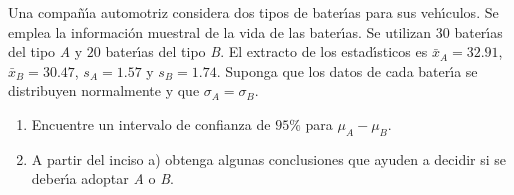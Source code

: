 \begin{enunciado}
 Una compa\~n\'{\i}a automotriz considera dos tipos de bater\'{\i}as para sus veh\'{\i}culos. Se emplea la informaci\'on muestral de la vida de las bater\'{\i}as. Se utilizan $30$ bater\'{\i}as del tipo \textit{A} y $20$ bater\'{\i}as del tipo \textit{B}. El extracto de los estad\'{\i}sticos es $\bar{x}_A = 32.91$, $\bar{x}_B = 30.47$, $s_A = 1.57$ y $s_B = 1.74$. Suponga que los datos de cada bater\'{\i}a se distribuyen normalmente y que $\sigma_A = \sigma_B$.
 \begin{enumerate}
  \item Encuentre un intervalo de confianza de $95\%$ para $\mu_A - \mu_B$.
  \item A partir del inciso a) obtenga algunas conclusiones que ayuden a decidir si se deber\'{\i}a adoptar \textit{A} o \textit{B}.
 \end{enumerate}
\end{enunciado}

